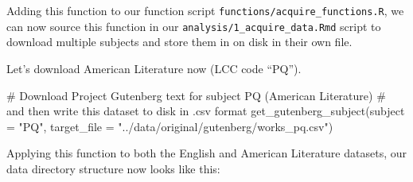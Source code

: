 \documentclass[
  letterpaper,
]{latex/krantz}
\newenvironment{Shaded}{\begin{snugshade}}{\end{snugshade}}
\newcommand{\AttributeTok}[1]{\textcolor[rgb]{0.40,0.45,0.13}{#1}}
\newcommand{\CommentTok}[1]{\textcolor[rgb]{0.37,0.37,0.37}{#1}}
\newcommand{\ControlFlowTok}[1]{\textcolor[rgb]{0.00,0.23,0.31}{#1}}
\newcommand{\FunctionTok}[1]{\textcolor[rgb]{0.28,0.35,0.67}{#1}}
\newcommand{\NormalTok}[1]{\textcolor[rgb]{0.00,0.23,0.31}{#1}}
\newcommand{\OtherTok}[1]{\textcolor[rgb]{0.00,0.23,0.31}{#1}}
\newcommand{\SpecialCharTok}[1]{\textcolor[rgb]{0.37,0.37,0.37}{#1}}
\newcommand{\StringTok}[1]{\textcolor[rgb]{0.13,0.47,0.30}{#1}}
\begin{document}
\begin{Shaded}
\end{Shaded}

Adding this function to our function script
\texttt{functions/acquire\_functions.R}, we can now source this function
in our \texttt{analysis/1\_acquire\_data.Rmd} script to download
multiple subjects and store them in on disk in their own file.

Let's download American Literature now (LCC code ``PQ'').

\begin{Shaded}
\begin{Highlighting}[]
\CommentTok{\# Download Project Gutenberg text for subject \textquotesingle{}PQ\textquotesingle{} (American Literature)}
\CommentTok{\# and then write this dataset to disk in .csv format}
\FunctionTok{get\_gutenberg\_subject}\NormalTok{(}\AttributeTok{subject =} \StringTok{"PQ"}\NormalTok{, }\AttributeTok{target\_file =} \StringTok{"../data/original/gutenberg/works\_pq.csv"}\NormalTok{)}
\end{Highlighting}
\end{Shaded}

Applying this function to both the English and American Literature
datasets, our data directory structure now looks like this:
\end{document}
